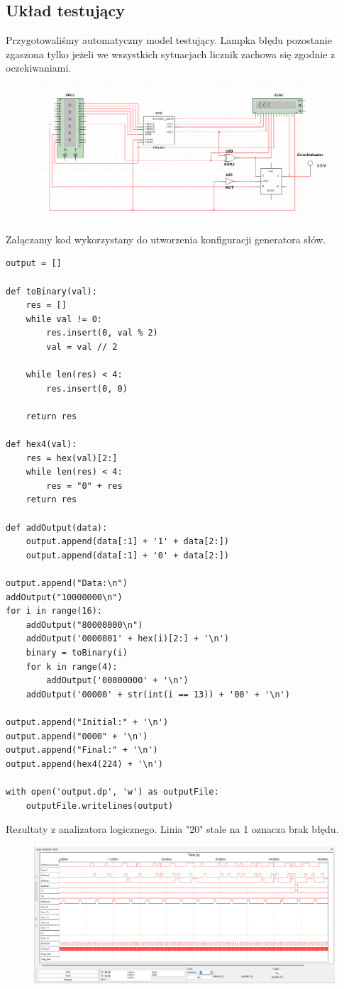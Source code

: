 \documentclass{article}
\begin{document}
\subsection{Układ testujący}
Przygotowaliśmy automatyczny model testujący. Lampka błędu pozostanie zgaszona tylko jeżeli we wszystkich sytuacjach licznik zachowa się zgodnie z oczekiwaniami.
\begin{figure}[H]
\includegraphics[width = \textwidth]{3b_tester}
\end{figure}
Załączamy kod wykorzystany do utworzenia konfiguracji generatora słów.
\begin{lstlisting}
output = []

def toBinary(val):
    res = []
    while val != 0:
        res.insert(0, val % 2)
        val = val // 2

    while len(res) < 4:
        res.insert(0, 0)
    
    return res

def hex4(val):
    res = hex(val)[2:]
    while len(res) < 4:
        res = "0" + res
    return res

def addOutput(data):
    output.append(data[:1] + '1' + data[2:])
    output.append(data[:1] + '0' + data[2:])

output.append("Data:\n")
addOutput("10000000\n") 
for i in range(16):
    addOutput("80000000\n")
    addOutput('0000001' + hex(i)[2:] + '\n')
    binary = toBinary(i)
    for k in range(4):                              
        addOutput('00000000' + '\n')
    addOutput('00000' + str(int(i == 13)) + '00' + '\n')

output.append("Initial:" + '\n')
output.append("0000" + '\n')
output.append("Final:" + '\n')
output.append(hex4(224) + '\n')

with open('output.dp', 'w') as outputFile:
    outputFile.writelines(output)
\end{lstlisting}
Rezultaty z analizatora logicznego. Linia "20" stale na 1 oznacza brak błędu.
\begin{figure}[H]
\includegraphics[width = \textwidth]{3b_analyzer}
\end{figure}
\end{document}
